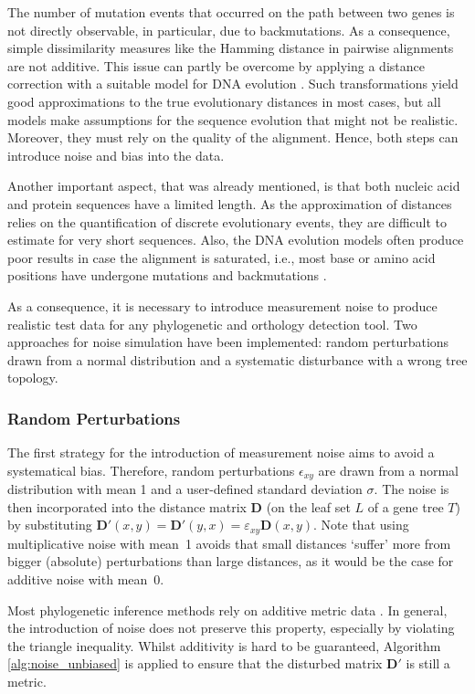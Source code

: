 \documentclass[hidelinks,11pt]{scrreprt}
\begin{document}
The number of mutation events that occurred on the path between two genes is not directly observable, in particular, due to backmutations. As a consequence, simple dissimilarity measures like the Hamming distance in pairwise alignments are not additive. This issue can partly be overcome by applying a distance correction with a suitable model for DNA evolution \citep{jukes1969,kimura1980,tavare1986}.
Such transformations yield good approximations to the true evolutionary distances in most cases, but all models make assumptions for the sequence evolution that might not be realistic. Moreover, they must rely on the quality of the alignment. Hence, both steps can introduce noise and bias into the data.

Another important aspect, that was already mentioned, is that both nucleic acid and protein sequences have a limited length. As the approximation of distances relies on the quantification of discrete evolutionary events, they are difficult to estimate for very short sequences. Also, the DNA evolution models often produce poor results in case the alignment is saturated, i.e., most base or amino acid positions have undergone mutations and backmutations \citep{philippe2011}.

As a consequence, it is necessary to introduce measurement noise to produce realistic test data for any phylogenetic and orthology detection tool. Two approaches for noise simulation have been implemented: random perturbations drawn from a normal distribution and a systematic disturbance with a wrong tree topology.

\subsubsection{Random Perturbations}

The first strategy for the introduction of measurement noise aims to avoid a systematical bias. Therefore, random perturbations $\epsilon_{xy}$ are drawn from a normal distribution with mean 1 and a user-defined standard deviation $\sigma$. The noise is then incorporated into the distance matrix $\mathbf{D}$ (on the leaf set $L$ of a gene tree $T$) by substituting
$\mathbf{D'}(x,y)=\mathbf{D'}(y,x)= \varepsilon_{xy}\mathbf{D}(x,y)$. Note that using multiplicative noise with mean~1 avoids that small distances `suffer' more from bigger (absolute) perturbations than large distances, as it would be the case for additive noise with mean~0.

Most phylogenetic inference methods rely on additive metric data \citep[cf.][]{retzlaff2018}. In general, the introduction of noise does not preserve this property, especially by violating the triangle inequality. Whilst additivity is hard to be guaranteed, Algorithm \ref{alg:noise_unbiased} is applied to ensure that the disturbed matrix $\mathbf{D'}$ is still a metric.
\end{document}
